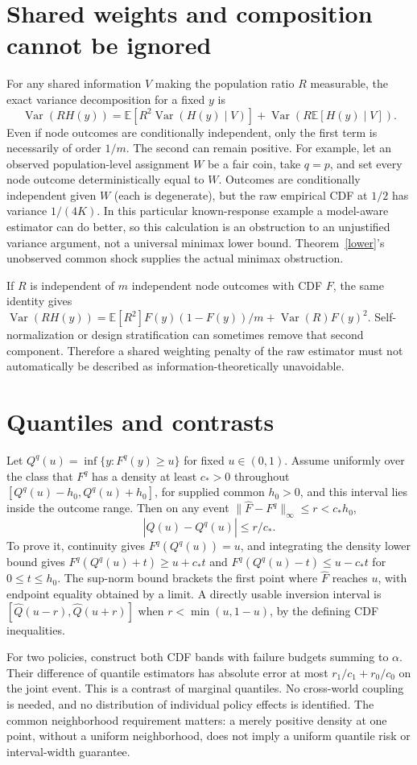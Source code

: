 \documentclass[11pt]{article}
\theoremstyle{remark}\newtheorem{remark}[theorem]{Remark}
\newcommand{\E}{\mathbb E}
\newcommand{\Var}{\operatorname{Var}}
\begin{document}
\section{Shared weights and composition cannot be ignored}
For any shared information $V$ making the population ratio $R$ measurable, the exact variance decomposition for a fixed $y$ is
\[
 \Var(RH(y))=\E[R^2\Var(H(y)\mid V)]
                   +\Var(R\E[H(y)\mid V]).
\]
Even if node outcomes are conditionally independent, only the first term is necessarily of order $1/m$. The second can remain positive. For example, let an observed population-level assignment $W$ be a fair coin, take $q=p$, and set every node outcome deterministically equal to $W$. Outcomes are conditionally independent given $W$ (each is degenerate), but the raw empirical CDF at $1/2$ has variance $1/(4K)$. In this particular known-response example a model-aware estimator can do better, so this calculation is an obstruction to an unjustified variance argument, not a universal minimax lower bound. Theorem~\ref{lower}'s unobserved common shock supplies the actual minimax obstruction.

If $R$ is independent of $m$ independent node outcomes with CDF $F$, the same identity gives
$\Var(RH(y))=\E[R^2]F(y)(1-F(y))/m+\Var(R)F(y)^2$.
Self-normalization or design stratification can sometimes remove that second component. Therefore a shared weighting penalty of the raw estimator must not automatically be described as information-theoretically unavoidable.

\section{Quantiles and contrasts}
Let $Q^q(u)=\inf\{y:F^q(y)\geq u\}$ for fixed $u\in(0,1)$. Assume uniformly over the class that $F^q$ has a density at least $c_*>0$ throughout
$[Q^q(u)-h_0,Q^q(u)+h_0]$, for supplied common $h_0>0$, and this interval lies inside the outcome range. Then on any event $\|\widehat F-F^q\|_\infty\leq r<c_*h_0$,
\[
 |\widehat Q(u)-Q^q(u)|\leq r/c_*.
\]
To prove it, continuity gives $F^q(Q^q(u))=u$, and integrating the density lower bound gives $F^q(Q^q(u)+t)\geq u+c_*t$ and $F^q(Q^q(u)-t)\leq u-c_*t$ for $0\leq t\leq h_0$. The sup-norm bound brackets the first point where $\widehat F$ reaches $u$, with endpoint equality obtained by a limit. A directly usable inversion interval is
$[\widehat Q(u-r),\widehat Q(u+r)]$ when $r<\min(u,1-u)$, by the defining CDF inequalities.

For two policies, construct both CDF bands with failure budgets summing to $\alpha$. Their difference of quantile estimators has absolute error at most
$r_1/c_1+r_0/c_0$ on the joint event. This is a contrast of marginal quantiles. No cross-world coupling is needed, and no distribution of individual policy effects is identified. The common neighborhood requirement matters: a merely positive density at one point, without a uniform neighborhood, does not imply a uniform quantile risk or interval-width guarantee.
\end{document}
